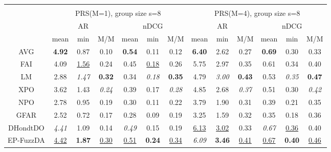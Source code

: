 \begin{tabular}{ c | c c c | c c c || c c c | c c c}
\multicolumn{12}{c}{} \\
\multicolumn{1}{c}{} & \multicolumn{6}{c}{PRS(M=1), group size s=8} & \multicolumn{6}{c}{PRS(M=4), group size s=8} \\
\multicolumn{1}{c}{} & \multicolumn{3}{c}{AR} & \multicolumn{3}{c}{nDCG} & \multicolumn{3}{c}{AR} & \multicolumn{3}{c}{nDCG} \\
& mean & min & M/M & mean & min & M/M & mean & min & M/M & mean & min & M/M \\
\hline
AVG & \textbf{4.92} & 0.87 & 0.10 & \textbf{0.54} & 0.11 & 0.12 & \textbf{6.40} & 2.62 & 0.27 & \textbf{0.69} & 0.30 & 0.33 \\
FAI & 4.09 & \underline{1.56} & 0.24 & 0.45 & \underline{0.18} & 0.26 & 5.75 & 2.97 & 0.35 & 0.61 & 0.34 & 0.40 \\
LM & 2.88 & \textit{1.47} & \textbf{0.32} & 0.34 & \textit{0.18} & \textbf{0.35} & 4.79 & \textit{3.00} & \textbf{0.43} & 0.53 & \textit{0.35} & \textbf{0.47} \\
XPO & 3.62 & 1.43 & \textit{0.24} & 0.39 & 0.17 & \textit{0.28} & 4.85 & 2.68 & \textit{0.37} & 0.51 & 0.30 & \textit{0.42} \\
NPO & 2.78 & 0.95 & 0.19 & 0.30 & 0.11 & 0.22 & 3.79 & 1.90 & 0.31 & 0.39 & 0.21 & 0.35 \\
GFAR & 2.52 & 0.72 & 0.17 & 0.28 & 0.09 & 0.19 & 3.25 & 1.59 & 0.32 & 0.35 & 0.18 & 0.36 \\
DHondtDO & \textit{4.41} & 1.09 & 0.14 & \textit{0.49} & 0.15 & 0.19 & \underline{6.13} & \underline{3.02} & 0.33 & \textit{0.67} & \underline{0.36} & 0.40 \\
EP-FuzzDA & \underline{4.42} & \textbf{1.87} & \underline{0.30} & \underline{0.51} & \textbf{0.24} & \underline{0.34} & \textit{6.09} & \textbf{3.46} & \underline{0.41} & \underline{0.67} & \textbf{0.40} & \underline{0.46} \\

\end{tabular}
